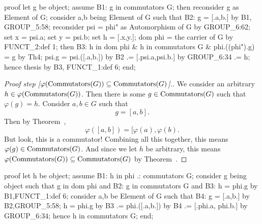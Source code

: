 \nwenddocs{}\endmoddef\nwstartdeflinemarkup{}\nwenddeflinemarkup
proof
  let g be object;
  assume B1: g in commutators G;
  then reconsider g as Element of G;
  consider a,b being Element of G such that
  B2: g = [.a,b.]
  by B1, GROUP_5:58;
  reconsider psi = phi" as Automorphism of G by GROUP_6:62;
  set x = psi.a;
  set y = psi.b;
  set h = [.x,y.];
  dom phi = the carrier of G by FUNCT_2:def 1;
  then B3: h in dom phi & h in commutators G & phi.((phi").g) = g by Th4;
  psi.g = psi.([.a,b.]) by B2
       .= [.psi.a,psi.b.] by GROUP_6:34
       .= h;
  hence thesis by B3, FUNCT_1:def 6;
end;
\nwendcode{}\nwdocspar

\begin{proof}[{Proof step [$\varphi(\operatorname{Commutators}(G))\subseteq\operatorname{Commutators}(G)$]}.]
We consider an arbitrary $h\in\varphi(\operatorname{Commutators}(G))$. Then there is
some $g\in\operatorname{Commutators}(G)$ such that $\varphi(g)=h$. Consider $a,b\in G$
such that
\begin{equation}
g=[a,b].
\end{equation}
Then by Theorem~,
\begin{equation}
\varphi([a,b])
= [\varphi(a),\varphi(b).
\end{equation}
But look, this is a commutator! Combining all this together, this means
$\varphi(g)\in\operatorname{Commutators}(G)$. And since we let $h$ be arbitrary, this
means $\varphi(\operatorname{Commutators}(G))\subseteq\operatorname{Commutators}(G)$ by Theorem~.
\end{proof}

\nwenddocs{}\endmoddef\nwstartdeflinemarkup{}\nwenddeflinemarkup
proof
  let h be object;
  assume B1: h in phi .: commutators G;
  consider g being object such that
      g in dom phi and
  B2: g in commutators G and
  B3: h = phi.g
  by B1,FUNCT_1:def 6;
  consider a,b be Element of G such that
  B4: g = [.a,b.]
  by B2,GROUP_5:58;
  h = phi.g by B3
   .= phi.([.a,b.]) by B4
   .= [.phi.a, phi.b.] by GROUP_6:34;
  hence h in commutators G;
end;
\nwendcode{}\nwdocspar

